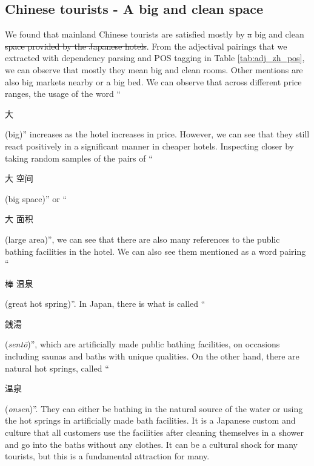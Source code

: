 \documentclass[smallextended,natbib]{svjour3}       %
\providecommand{\DIFadd}[1]{{\protect\color{blue}\uwave{#1}}} %
\providecommand{\DIFdel}[1]{{\protect\color{red}\sout{#1}}}                      %
\providecommand{\DIFaddbegin}{} %
\providecommand{\DIFaddend}{} %
\providecommand{\DIFdelbegin}{} %
\providecommand{\DIFdelend}{} %
\newcommand{\DIFscaledelfig}{0.5}
\newlength{\DIFdelgraphicswidth} %
\newlength{\DIFdelgraphicsheight} %
\newcommand{\DIFaddincludegraphics}[2][]{{\color{blue}\fbox{\DIFOincludegraphics[#1]{#2}}}} %
\newcommand{\DIFdelincludegraphics}[2][]{%
\sbox{\DIFdelgraphicsbox}{\DIFOincludegraphics[#1]{#2}}%
\settoboxwidth{\DIFdelgraphicswidth}{\DIFdelgraphicsbox} %
\settoboxtotalheight{\DIFdelgraphicsheight}{\DIFdelgraphicsbox} %
\scalebox{\DIFscaledelfig}{%
\parbox[b]{\DIFdelgraphicswidth}{\usebox{\DIFdelgraphicsbox}\\[-\baselineskip] \rule{\DIFdelgraphicswidth}{0em}}\llap{\resizebox{\DIFdelgraphicswidth}{\DIFdelgraphicsheight}{%
\setlength{\unitlength}{\DIFdelgraphicswidth}%
\begin{picture}(1,1)%
\thicklines\linethickness{2pt} %
{\color[rgb]{1,0,0}\put(0,0){\framebox(1,1){}}}%
{\color[rgb]{1,0,0}\put(0,0){\line( 1,1){1}}}%
{\color[rgb]{1,0,0}\put(0,1){\line(1,-1){1}}}%
\end{picture}%
}\hspace*{3pt}}} %
} %
\DeclareRobustCommand{\DIFaddbegin}{\DIFOaddbegin \let\includegraphics\DIFaddincludegraphics} %
\DeclareRobustCommand{\DIFaddend}{\DIFOaddend \let\includegraphics\DIFOincludegraphics} %
\DeclareRobustCommand{\DIFdelbegin}{\DIFOdelbegin \let\includegraphics\DIFdelincludegraphics} %
\DeclareRobustCommand{\DIFdelend}{\DIFOaddend \let\includegraphics\DIFOincludegraphics} %
\begin{document}
  \subsection{Chinese tourists - A big and clean space}\label{disc:zh}

    We found that mainland Chinese tourists are satisfied mostly by \DIFdelbegin \DIFdel{a }\DIFdelend \DIFaddbegin \DIFadd{Japanese hotels' }\DIFaddend big and clean \DIFdelbegin \DIFdel{space provided by the Japanese hotels}\DIFdelend \DIFaddbegin \DIFadd{spaces}\DIFaddend . From the adjectival pairings that we extracted with dependency parsing and POS tagging in Table \ref{tab:adj_zh_pos}, we can observe that mostly they mean big and clean rooms. Other mentions are also big markets nearby or a big bed. We can observe that across different price ranges, the usage of the word ``\begin{CJK}{UTF8}{gbsn}大\end{CJK} (big)'' increases as the hotel increases in price. However, we can see that they still react positively in a significant manner in cheaper hotels. Inspecting closer by taking random samples of the pairs of ``\begin{CJK}{UTF8}{gbsn}大 空间\end{CJK} (big space)'' or ``\begin{CJK}{UTF8}{gbsn}大 面积\end{CJK} (large area)'', we can see that there are also many references to the public bathing facilities in the hotel. We can also see them mentioned as a word pairing ``\begin{CJK}{UTF8}{gbsn}棒 温泉\end{CJK} (great hot spring)''. In Japan, there is what is called ``\begin{CJK}{UTF8}{min}銭湯\end{CJK} (\textit{sent\=o})'', which are artificially made public bathing facilities, on occasions including saunas and baths with unique qualities. On the other hand, there are natural hot springs, called ``\begin{CJK}{UTF8}{gbsn}温泉\end{CJK} (\textit{onsen})''. They can either be bathing in the natural source of the water or using the hot springs in artificially made bath facilities. It is a Japanese custom and culture that all customers use the facilities after cleaning themselves in a shower and go into the baths without any clothes. It can be a cultural shock for many tourists, but this is a fundamental attraction for many. 
\end{document}
